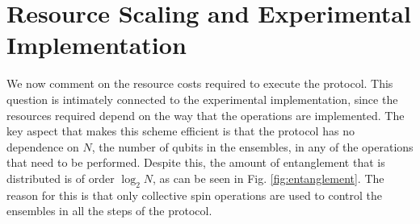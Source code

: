 \documentclass[%
  prx,%
  twocolumn,%
  preprintnumbers,%
  amsmath,%
  amssymb,%
  superscriptaddress%
]{revtex4}
\begin{document}










\section{Resource Scaling and Experimental Implementation}

We now comment on the resource costs required to execute the protocol.  This question is intimately connected to the experimental implementation, since the resources required depend on the way that the operations are implemented. 
The key aspect that makes this scheme efficient is that the protocol has no dependence on $ N $, the number of qubits in the ensembles, in any of the operations that need to be performed.  Despite this, the amount of entanglement that is distributed is of order $ \log_2 N $, as can be seen in Fig. \ref{fig:entanglement}.  The reason for this is that only collective spin operations are used to control the ensembles in all the steps of the protocol. 
\end{document}
